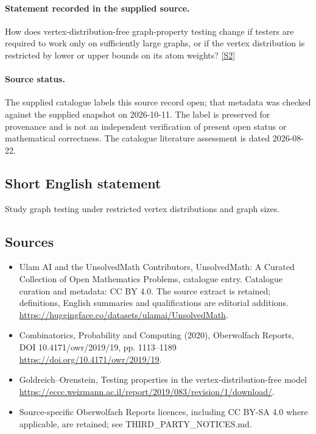 \documentclass[11pt]{article}
\begin{document}
\paragraph{Statement recorded in the supplied source.}
How does vertex-distribution-free graph-property testing change if testers are required to work only on sufficiently large graphs, or if the vertex distribution is restricted by lower or upper bounds on its atom weights? \href{https://doi.org/10.4171/owr/2019/19}{[S2]}
\paragraph{Source status.}
The supplied catalogue labels this source record open; that metadata was checked against the supplied snapshot on 2026-10-11. The label is preserved for provenance and is not an independent verification of present open status or mathematical correctness. The catalogue literature assessment is dated 2026-08-22.
\subsection{Short English statement}
Study graph testing under restricted vertex distributions and graph sizes.
\subsection{Sources}
\begin{itemize}
\item[S1] Ulam AI and the UnsolvedMath Contributors, UnsolvedMath: A Curated Collection of Open Mathematics Problems, catalogue entry. Catalogue curation and metadata: CC BY 4.0. The source extract is retained; definitions, English summaries and qualifications are editorial additions.
\url{https://huggingface.co/datasets/ulamai/UnsolvedMath}.
\item[S2] Combinatorics, Probability and Computing (2020), Oberwolfach Reports, DOI 10.4171/owr/2019/19, pp. 1113--1189
\url{https://doi.org/10.4171/owr/2019/19}.
\item[S3] Goldreich--Orenstein, Testing properties in the vertex-distribution-free model
\url{https://eccc.weizmann.ac.il/report/2019/083/revision/1/download/}.
\item Source-specific Oberwolfach Reports licences, including CC BY-SA 4.0 where applicable, are retained; see THIRD\_PARTY\_NOTICES.md.
\end{itemize}
\end{document}

